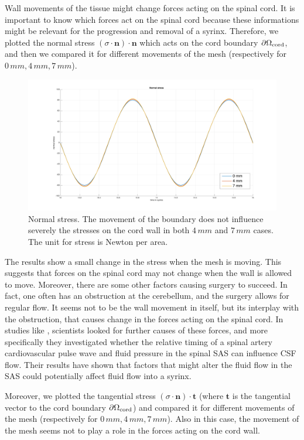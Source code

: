 \documentclass[a4paper,11pt,oneside]{book}
\begin{document}
Wall movements of the tissue might change forces acting on the spinal cord. It is important to know which forces act on the spinal cord because these informations might be relevant for the progression and removal of a syrinx. Therefore, we plotted the normal stress $(\sigma \cdot \mathbf{n}) \cdot \mathbf{n}$ which acts on the cord boundary $\partial \Omega_{\rm cord}$, and then we compared it for different movements of the mesh (respectively for $0 \, mm, 4 \, mm, 7 \, mm$).

\begin{figure}[h!]
\centering
\includegraphics[width=\textwidth]{images/normal_stress.png}
\caption{Normal stress. The movement of the boundary does not influence severely the stresses on the cord wall in both $4 \, mm$ and $7 \, mm$ cases. The unit for stress is Newton per area.}
\end{figure}
The results show a small change in the stress when the mesh is moving. This suggests that forces on the spinal cord may not change when the wall is allowed to move. Moreover, there are some other factors causing surgery to succeed. In fact, one often has an obstruction at the cerebellum, and the surgery allows for regular flow. It seems not to be the wall movement in itself, but its interplay with the obstruction, that causes change in the forces acting on the spinal cord. In studies like \cite{bilston}, scientists looked for further causes of these forces, and more specifically they investigated whether the relative timing of a spinal artery cardiovascular pulse wave and fluid pressure in the spinal SAS can influence CSF flow. Their results have shown that factors that might alter the fluid flow in the SAS could potentially affect fluid flow into a syrinx.

Moreover, we plotted the tangential stress $(\sigma \cdot \mathbf{n}) \cdot \mathbf{t}$ (where $\mathbf{t}$ is the tangential vector to the cord boundary $\partial \Omega_{\rm cord}$) and compared it for different movements of the mesh (respectively for $0 \, mm, 4 \, mm, 7 \, mm$). Also in this case, the movement of the mesh seems not to play a role in the forces acting on the cord wall.
\end{document}
